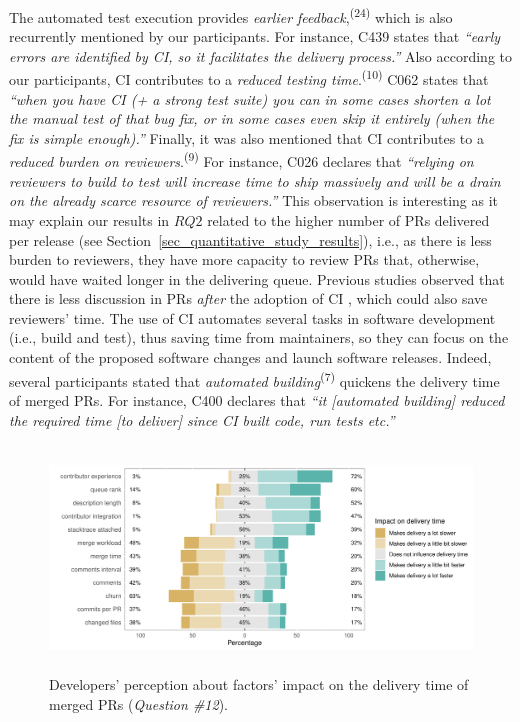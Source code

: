 The automated test execution provides \textit{earlier feedback},\textsuperscript{(24)} which is also recurrently mentioned by our participants. For instance, C439 states that \textit{``early errors are identified by CI, so it facilitates the delivery process.''} 
Also according to our participants, CI contributes to a \textit{reduced testing time}.\textsuperscript{(10)} C062 states that \textit{``when you have CI (+ a strong test suite) you can in some cases shorten a lot the manual test of that bug fix, or in some cases even skip it entirely (when the fix is simple enough).''} Finally, it was also mentioned that CI contributes to a \textit{reduced burden on reviewers}.\textsuperscript{(9)} For instance, C026 declares that \textit{``relying on reviewers to build to test will increase time to ship massively and will be a drain on the already scarce resource of reviewers.''} This observation is interesting as it may explain our results in $RQ2$ related to the higher number of PRs delivered per release (see Section~\ref{sec_quantitative_study_results}), i.e., as there is less burden to reviewers, they have more capacity to review PRs that, otherwise, would have waited longer in the delivering queue. Previous studies observed that there is less discussion in PRs \textit{after} the adoption of CI \citep{cassee2020silent}, which could also save reviewers' time. The use of CI automates several tasks in software development (i.e., build and test), thus saving time from maintainers, so they can focus on the content of the proposed software changes and launch software releases. Indeed, several participants stated that \textit{automated building}\textsuperscript{(7)} quickens the delivery time of merged PRs. For instance, C400 declares that \textit{``it [automated building] reduced the required time [to deliver] since CI built code, run tests etc.''} 

\begin{figure}[hbt!]
	\includegraphics[height=6cm, width=12cm]{factors_impact_on_delivery_time.pdf}
	\caption{Developers' perception about factors' impact on the delivery time of merged PRs (\textit{Question \#12}).}
	\label{fig:factors_impact_on_delivery_time}       %
\end{figure}

